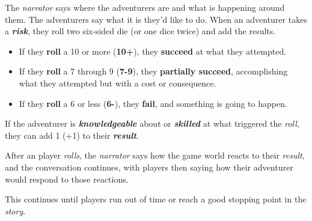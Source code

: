 \documentclass[11pt]{teraum_adventure}
\begin{document}
The \emph{narrator} says where the adventurers are and what is happening
around them. The adventurers say what it is they'd like to do. When an
adventurer takes a \textbf{\emph{risk}}, they roll two six-sided die (or one dice
twice) and add the results.

\begin{itemize}
\item If they \textbf{roll} a 10 or more (\textbf{10+}), they \textbf{succeed} at what they
attempted.
\item If they \textbf{roll} a 7 through 9 (\textbf{7-9}), they \textbf{partially succeed},
accomplishing what they attempted but with a cost or consequence.
\item If they \textbf{roll} a 6 or less (\textbf{6-}), they \textbf{fail}, and something is
going to happen.
\end{itemize}

If the adventurer is \textbf{\emph{knowledgeable}} about or \textbf{\emph{skilled}} at what
triggered the \emph{roll}, they can add 1 (+1) to their \textbf{\emph{result}}.

After an player \emph{rolls}, the \emph{narrator} says how the game world reacts
to their \emph{result}, and the conversation continues, with players then
saying how their adventurer would respond to those reactions.

This continues until players run out of time or reach a good stopping
point in the \emph{story}.
\end{document}

